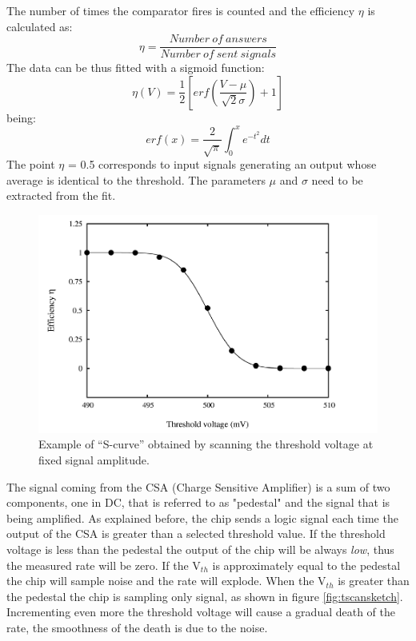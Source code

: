 The number of times the comparator fires is counted and the efficiency $\eta$
is calculated as:
\begin{equation}
	\eta = \frac{Number \: of \: answers}{Number \: of \: sent \: signals}
\end{equation}
The data can be thus fitted with a sigmoid function:
\begin{equation}\label{erf}
	\eta (V) = \frac{1}{2} [erf(\frac{V-\mu}{\sqrt{2}\sigma})+1]
\end{equation}
being:
\begin{equation}
	erf(x) = \frac{2}{\sqrt{\pi}} \int_{0}^{x} e^{-t^2} dt
\end{equation}
The point $\eta$ = 0.5 corresponds to input signals generating an output whose average is identical to the threshold. The parameters $\mu$ and $\sigma$ need to be extracted from the fit.
\begin{figure}[H]
	\centering
	\includegraphics[width=0.65\linewidth]{IMG/ch5/THexample}
	\caption{Example of “S-curve” obtained by scanning the threshold voltage at fixed signal amplitude.}
	\label{fig:thexample}
\end{figure}
\noindent The signal coming from the CSA (Charge Sensitive Amplifier) is a sum of two components, one in DC, that is referred to as "pedestal" and the signal that is being amplified.
As explained before, the chip sends a logic signal each time the output of the CSA is greater than a selected threshold value.
If the threshold voltage is less than the pedestal the output of the chip will be always \textit{low}, thus the measured rate will be zero.
If the V$_{th}$ is approximately equal to the pedestal the chip will sample noise and the rate will explode.
When the V$_{th}$ is greater than the pedestal the chip is sampling only signal, as shown in figure \ref{fig:tscansketch}.
Incrementing even more the threshold voltage will cause a gradual death of the rate, the smoothness of the death is due to the noise.
